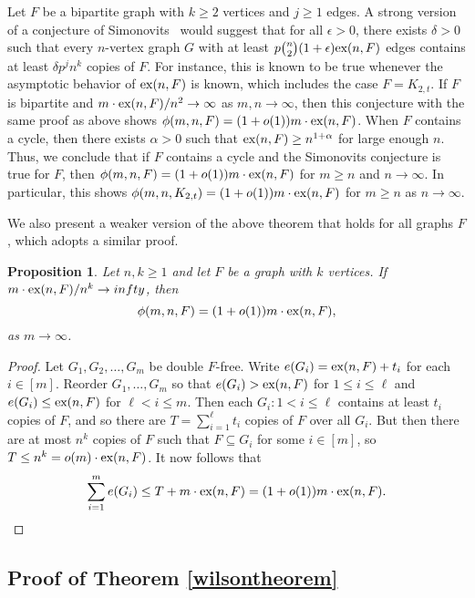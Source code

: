 \documentclass[12pt]{article}
\newtheorem{proposition}[theorem]{Proposition}
\newcommand*{\ex}{\textnormal{ex}}
\begin{document}
Let $F$ be a bipartite graph with $k \geq 2$ vertices and $j \geq 1$ edges. A strong version of a conjecture of Simonovits~\cite{Sidorenko1993,Simonovits1984} would suggest that for all $\epsilon > 0$, there exists $\delta > 0$ such that every $n$-vertex graph $G$ with at least $p\binom{n}{2}(1 + \epsilon)\ex(n,F)$ edges contains at least $\delta p^j n^{k}$ copies of $F$. For instance, this is known to be true whenever the asymptotic behavior of $\ex(n,F)$ is known, which includes the case $F = K_{2,t}$. If $F$ is bipartite and $m \cdot \ex(n,F)/n^2 \rightarrow \infty$ as $m,n \rightarrow \infty$, then this conjecture with the same proof as above shows $\phi(m,n,F) = (1 + o(1))m \cdot \ex(n,F)$. When $F$ contains a cycle, then there exists $\alpha > 0$ such that $\ex(n,F) \geq n^{1 + \alpha}$ for large enough $n$. Thus, we conclude that if $F$ contains a cycle and the Simonovits conjecture is true for $F$, then $\phi(m,n,F) = (1 + o(1))m \cdot \ex(n,F)$ for $m \geq n$ and $n \rightarrow \infty$. In particular, this shows $\phi(m,n,K_{2,t}) = (1 + o(1))m \cdot \ex(n,F)$ for $m \geq n$ as $n \rightarrow \infty$.

We also present a weaker version of the above theorem that holds for all graphs $F$, which adopts a similar proof.

\begin{proposition}\label{thm:asymp-weak}
  Let $n, k \geq 1$ and let $F$ be a graph with $k$ vertices. If $m \cdot \ex(n, F)/n^k \to infty$, then
  \[
    \phi(m, n, F) = (1 + o(1))m \cdot \ex(n, F),
  \]
  as $m \to \infty$.
\end{proposition}

\begin{proof}
  Let $G_1, G_2, \ldots, G_m$ be double $F$-free. Write $e(G_i) = \ex(n, F) + t_i$ for each $i \in [m]$. Reorder $G_1, \ldots, G_m$ so that $e(G_i) > \ex(n, F)$ for $1 \leq i \leq \ell$ and $e(G_i) \leq \ex(n, F)$ for $\ell < i \leq m$. Then each $G_i : 1 < i \leq \ell$ contains at least $t_i$ copies of $F$, and so there are $T = \sum_{i = 1}^\ell t_i$ copies of $F$ over all $G_i$. But then there are at most $n^k$ copies of $F$ such that $F \subseteq G_i$ for some $i \in [m]$, so $T \leq n^k = o(m) \cdot \ex(n, F)$. It now follows that
  \[
    \sum_{i = 1}^m e(G_i) \leq T + m \cdot \ex(n, F) = (1 + o(1))m \cdot \ex(n, F).
  \]
\end{proof}

\subsection{Proof of Theorem \ref{wilsontheorem}} 
\end{document}
